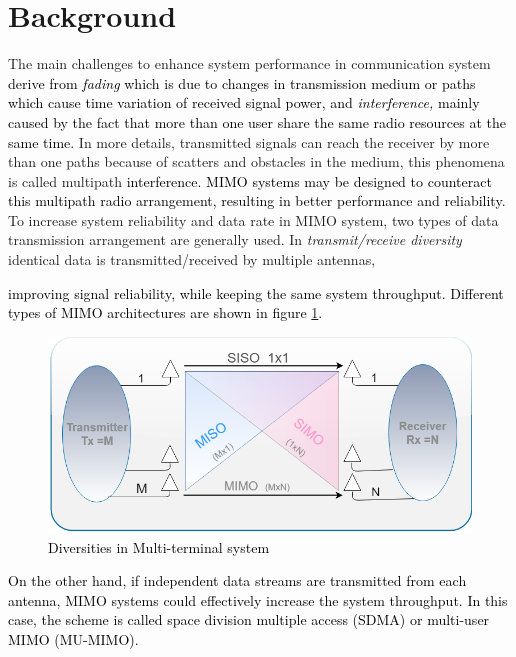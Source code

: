 \section{Background}
The main challenges to enhance system performance in communication system \textcolor{black}{derive from \textit{fading} which is due to changes in transmission medium or paths which cause time variation of received signal power, and \textit{interference,} mainly caused by the fact that more than one user share the same radio resources at the same time.} In more details, transmitted signals can reach the receiver by more than one paths because of scatters and obstacles in the medium, this phenomena is called multipath \textcolor{black}{interference. %
MIMO systems may be designed to counteract this multipath radio arrangement, resulting in better performance and reliability.}
To increase system reliability and data rate in MIMO system, two types of data transmission arrangement are generally used. In \textit{transmit/receive diversity} identical data is transmitted/received by multiple antennas, \textcolor{black}{improving signal reliability, while keeping the same system throughput. Different types of MIMO architectures are shown in figure \ref{mimo}.
\begin{figure}
\includegraphics[scale=0.8]{figures/MIMO.png}
\caption{Diversities in Multi-terminal system}
\centering
\label{mimo}
\end{figure}
On the other hand, if independent data streams are transmitted from each antenna, MIMO systems could effectively increase the system throughput. In this case, the scheme is called space division multiple access (SDMA) or multi-user MIMO (MU-MIMO).}

